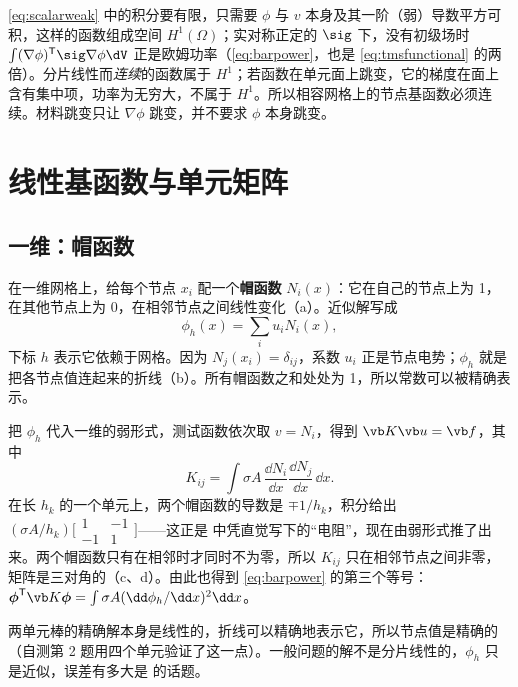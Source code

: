 \begin{deeper}[函数空间]
\eqref{eq:scalarweak} 中的积分要有限，只需要 $\phi$ 与 $v$ 本身及其一阶（弱）导数平方可积，这样的函数组成空间 $H^1(\Omega)$；实对称正定的 $\sig$ 下，没有初级场时 $\int(\nabla\phi)^{\mathsf T}\sig\nabla\phi\dV$ 正是欧姆功率（\eqref{eq:barpower}，也是 \eqref{eq:tmsfunctional} 的两倍）。分片线性而\emph{连续}的函数属于 $H^1$；若函数在单元面上跳变，它的梯度在面上含有集中项，功率为无穷大，不属于 $H^1$。所以相容网格上的节点基函数必须连续。材料跳变只让 $\nabla\phi$ 跳变，并不要求 $\phi$ 本身跳变。
\end{deeper}

\section{线性基函数与单元矩阵}\label{sec:femscalar-basis}

\subsection{一维：帽函数}
在一维网格上，给每个节点 $x_i$ 配一个\textbf{帽函数} $N_i(x)$：它在自己的节点上为 1，在其他节点上为 0，在相邻节点之间线性变化（a）。近似解写成
\begin{equation*}
\phi_h(x)=\sum_iu_iN_i(x),
\end{equation*}
下标 $h$ 表示它依赖于网格。因为 $N_j(x_i)=\delta_{ij}$，系数 $u_i$ 正是节点电势；$\phi_h$ 就是把各节点值连起来的折线（b）。所有帽函数之和处处为 1，所以常数可以被精确表示。

把 $\phi_h$ 代入一维的弱形式，测试函数依次取 $v=N_i$，得到 $\vb K\vb u=\vb f$，其中
\begin{equation*}
K_{ij}=\int\sigma A\,\frac{\dd N_i}{\dd x}\frac{\dd N_j}{\dd x}\,\dd x .
\end{equation*}
在长 $h_k$ 的一个单元上，两个帽函数的导数是 $\mp1/h_k$，积分给出 $(\sigma A/h_k)\bigl[\begin{smallmatrix}1&-1\\-1&1\end{smallmatrix}\bigr]$——这正是 中凭直觉写下的“电阻”，现在由弱形式推了出来。两个帽函数只有在相邻时才同时不为零，所以 $K_{ij}$ 只在相邻节点之间非零，矩阵是三对角的（c、d）。由此也得到 \eqref{eq:barpower} 的第三个等号：$\boldsymbol\phi^{\mathsf T}\vb K\boldsymbol\phi=\int\sigma A(\dd\phi_h/\dd x)^2\dd x$。

两单元棒的精确解本身是线性的，折线可以精确地表示它，所以节点值是精确的（自测第 2 题用四个单元验证了这一点）。一般问题的解不是分片线性的，$\phi_h$ 只是近似，误差有多大是 的话题。

